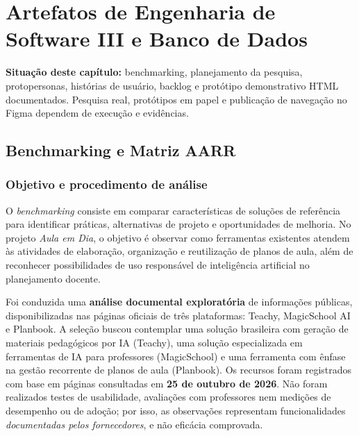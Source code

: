 \documentclass[12pt,a4paper,oneside]{report}
\begin{document}
\chapter{Artefatos de Engenharia de Software III e Banco de Dados}
\noindent\textbf{Situação deste capítulo:} benchmarking, planejamento da pesquisa, protopersonas, histórias de usuário, backlog e protótipo demonstrativo HTML documentados. Pesquisa real, protótipos em papel e publicação de navegação no Figma dependem de execução e evidências.
\section{Benchmarking e Matriz AARR}
\label{sec:benchmarking}

\subsection{Objetivo e procedimento de análise}
O \textit{benchmarking} consiste em comparar características de soluções de referência para identificar práticas, alternativas de projeto e oportunidades de melhoria. No projeto \textit{Aula em Dia}, o objetivo é observar como ferramentas existentes atendem às atividades de elaboração, organização e reutilização de planos de aula, além de reconhecer possibilidades de uso responsável de inteligência artificial no planejamento docente.

Foi conduzida uma \textbf{análise documental exploratória} de informações públicas, disponibilizadas nas páginas oficiais de três plataformas: Teachy, MagicSchool AI e Planbook. A seleção buscou contemplar uma solução brasileira com geração de materiais pedagógicos por IA (Teachy), uma solução especializada em ferramentas de IA para professores (MagicSchool) e uma ferramenta com ênfase na gestão recorrente de planos de aula (Planbook). Os recursos foram registrados com base em páginas consultadas em \textbf{25 de outubro de 2026}. Não foram realizados testes de usabilidade, avaliações com professores nem medições de desempenho ou de adoção; por isso, as observações representam funcionalidades \emph{documentadas pelos fornecedores}, e não eficácia comprovada.
\end{document}
